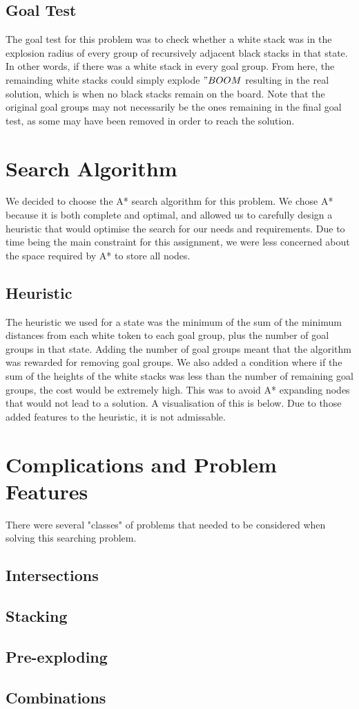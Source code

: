 \documentclass[11pt]{article}
\begin{document}
    \subsection{Goal Test}
    The goal test for this problem was to check whether a white stack was in the explosion radius of every group of recursively adjacent
    black stacks in that state. In other words, if there was a white stack in every goal group. From here, the remainding white stacks could
    simply explode \("BOOM\) resulting in the real solution, which is when no black stacks remain on the board. Note that the original goal groups
    may not necessarily be the ones remaining in the final goal test, as some may have been removed in order to reach the solution.
    \section{Search Algorithm}
    We decided to choose the A* search algorithm for this problem. We chose A* because it is both complete and optimal, and allowed us to carefully
    design a heuristic that would optimise the search for our needs and requirements. Due to time being the main constraint for this assignment, we were
    less concerned about the space required by A* to store all nodes.
    \subsection{Heuristic}
    The heuristic we used for a state was the minimum of the sum of the minimum distances from each white token to each goal group, plus
    the number of goal groups in that state. Adding the number of goal groups meant that
    the algorithm was rewarded for removing goal groups. We also added a condition where if the sum of the heights of the white stacks was less than
    the number of remaining goal groups, the cost would be extremely high. This was to avoid A* expanding nodes that would not lead to a solution.
    A visualisation of this is below. Due to those added features to the heuristic, it is not admissable.
    \section{Complications and Problem Features}
    There were several "classes" of problems that needed to be considered when solving this searching problem.
    \subsection{Intersections}
    \subsection{Stacking}
    \subsection{Pre-exploding}
    \subsection{Combinations}
\end{document}

